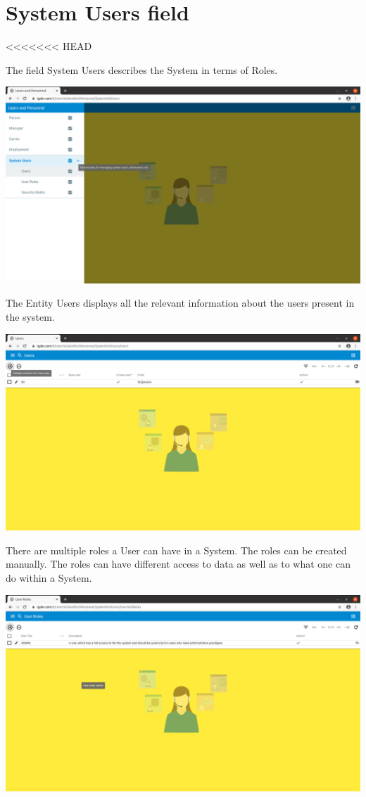 \section{System Users field}
<<<<<<< HEAD

The field System Users describes the System in terms of Roles. 

\includegraphics[width=\textwidth]{sections/01-chapter/images/system11.png}

The Entity Users displays all the relevant information about the users present in the system.

\includegraphics[width=\textwidth]{sections/01-chapter/images/system12.png}

There are multiple roles a User can have in a System. The roles can be created manually. The roles can have different access to data as well as to what one can do within a System.

\includegraphics[width=\textwidth]{sections/01-chapter/images/system13.png}

